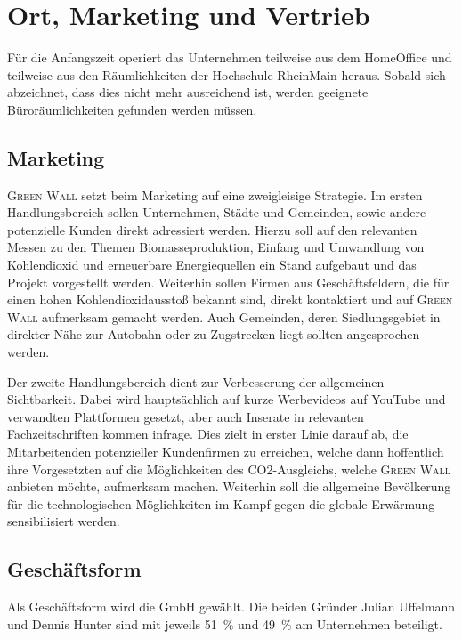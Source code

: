\chapter{Ort, Marketing und Vertrieb}

    Für die Anfangszeit operiert das Unternehmen teilweise aus dem HomeOffice und teilweise aus den Räumlichkeiten der Hochschule RheinMain heraus. 
    Sobald sich abzeichnet, dass dies nicht mehr ausreichend ist, werden geeignete Büroräumlichkeiten gefunden werden müssen.

    \section{Marketing}

        \textsc{Green Wall} setzt beim Marketing auf eine zweigleisige Strategie.
        Im ersten Handlungsbereich sollen Unternehmen, Städte und Gemeinden, sowie andere potenzielle Kunden direkt adressiert werden.
        Hierzu soll auf den relevanten Messen zu den Themen Biomasseproduktion, Einfang und Umwandlung von Kohlendioxid und erneuerbare Energiequellen ein Stand aufgebaut und das Projekt vorgestellt werden.
        Weiterhin sollen Firmen aus Geschäftsfeldern, die für einen hohen Kohlendioxidausstoß bekannt sind, direkt kontaktiert und auf \textsc{Green Wall} aufmerksam gemacht werden.
        Auch Gemeinden, deren Siedlungsgebiet in direkter Nähe zur Autobahn oder zu Zugstrecken liegt sollten angesprochen werden.

        Der zweite Handlungsbereich dient zur Verbesserung der allgemeinen Sichtbarkeit.
        Dabei wird hauptsächlich auf kurze Werbevideos auf YouTube und verwandten Plattformen gesetzt, aber auch Inserate in relevanten Fachzeitschriften kommen infrage.
        Dies zielt in erster Linie darauf ab, die Mitarbeitenden potenzieller Kundenfirmen zu erreichen, welche dann hoffentlich ihre Vorgesetzten auf die Möglichkeiten des CO2-Ausgleichs, welche \textsc{Green Wall} anbieten möchte, aufmerksam machen.
        Weiterhin soll die allgemeine Bevölkerung für die technologischen Möglichkeiten im Kampf gegen die globale Erwärmung sensibilisiert werden.

    \section{Geschäftsform}

        Als Geschäftsform wird die GmbH gewählt.
        Die beiden Gründer Julian Uffelmann und Dennis Hunter sind mit jeweils \qty{51}{\percent} und \qty{49}{\percent} am Unternehmen beteiligt. 